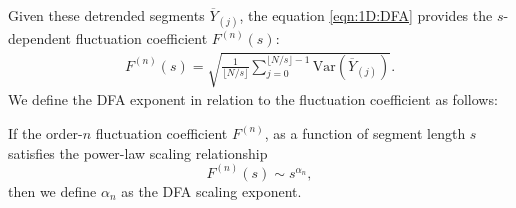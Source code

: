 Given these detrended segments $\overline{Y}_{(j)}$, the equation \ref{eqn:1D:DFA} provides the $s$-dependent fluctuation coefficient $F^{(n)}(s)$:
	\begin{align}
		F^{(n)}(s) = \sqrt{ \frac{1}{\lfloor N/s \rfloor} \sum_{j=0}^{\lfloor N/s \rfloor-1} \text{Var}(\overline{Y}_{(j)})}.
		\label{eqn:1D:DFA}
	\end{align}
We define the DFA exponent in relation to the fluctuation coefficient as follows:
\begin{definition}
	\label{def:1D:DFAexponent}
	{\Red If the order-$n$ fluctuation coefficient $F^{(n)}$, as a function of segment length $s$ satisfies the power-law scaling relationship
	\begin{equation} 
		F^{(n)}(s) \sim s^{\alpha_n}, 
	\label{eqn:1D:DFA_scaling_equation} 
	\end{equation}
	then we define $\alpha_n$ as the DFA scaling exponent.}
\end{definition}
